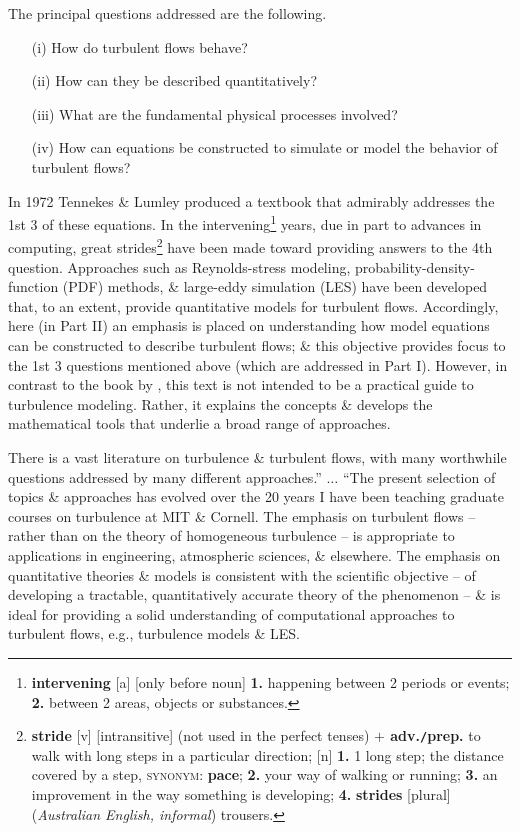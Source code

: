 \documentclass[oneside]{book}
\numberwithin{equation}{section}
\begin{document}
The principal questions addressed are the following.
\begin{itemize}
	\item[(i)] How do turbulent flows behave?
	\item[(ii)] How can they be described quantitatively?
	\item[(iii)] What are the fundamental physical processes involved?
	\item[(iv)] How can equations be constructed to simulate or model the behavior of turbulent flows?
\end{itemize}
In 1972 Tennekes \& Lumley produced a textbook that admirably addresses the 1st 3 of these equations. In the intervening\footnote{\textbf{intervening} [a] [only before noun] \textbf{1.} happening between 2 periods or events; \textbf{2.} between 2 areas, objects or substances.} years, due in part to advances in computing, great strides\footnote{\textbf{stride} [v] [intransitive] (not used in the perfect tenses) \textbf{$+$ adv.\texttt{/}prep.} to walk with long steps in a particular direction; [n] \textbf{1.} 1 long step; the distance covered by a step, \textsc{synonym}: \textbf{pace}; \textbf{2.} your way of walking or running; \textbf{3.} an improvement in the way something is developing; \textbf{4.} \textbf{strides} [plural] (\textit{Australian English, informal}) trousers.} have been made toward providing answers to the 4th question. Approaches such as Reynolds-stress modeling, probability-density-function (PDF) methods, \& large-eddy simulation (LES) have been developed that, to an extent, provide quantitative models for turbulent flows. Accordingly, here (in Part II) an emphasis is placed on understanding how model equations can be constructed to describe turbulent flows; \& this objective provides focus to the 1st 3 questions mentioned above (which are addressed in Part I). However, in contrast to the book by \cite{Wilcox2006}, this text is not intended to be a practical guide to turbulence modeling. Rather, it explains the concepts \& develops the mathematical tools that underlie a broad range of approaches.

There is a vast literature on turbulence \& turbulent flows, with many worthwhile questions addressed by many different approaches.'' $\ldots$ ``The present selection of topics \& approaches has evolved over the 20 years I have been teaching graduate courses on turbulence at MIT \& Cornell. The emphasis on turbulent flows -- rather than on the theory of homogeneous turbulence -- is appropriate to applications in engineering, atmospheric sciences, \& elsewhere. The emphasis on quantitative theories \& models is consistent with the scientific objective -- of developing a tractable, quantitatively accurate theory of the phenomenon -- \& is ideal for providing a solid understanding of computational approaches to turbulent flows, e.g., turbulence models \& LES.
\end{document}
